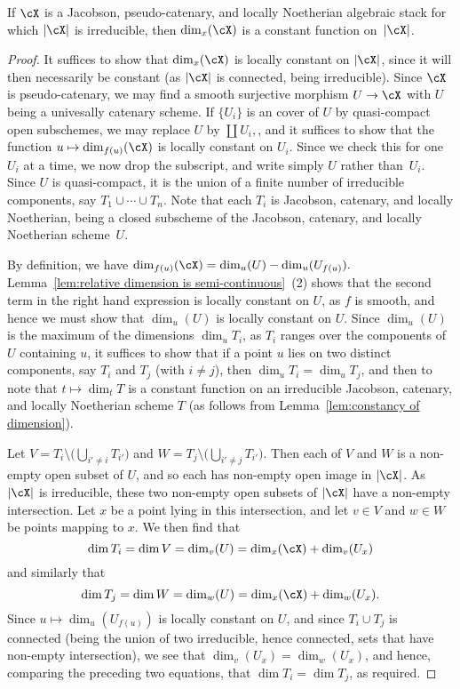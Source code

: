 \begin{alemma}
\label{lem:irreducible implies equidimensional}
If $\cX$ is
a Jacobson, pseudo-catenary, and locally Noetherian  algebraic stack
for which $|\cX|$ is irreducible,
then $\dim_x(\cX)$ is a constant function on~$|\cX|$.
\end{alemma}
\begin{proof}
It suffices to show that $\dim_x(\cX)$ is locally constant on $|\cX|$,
since it will then necessarily be constant (as $|\cX|$ is connected,
being irreducible).  Since $\cX$ is pseudo-catenary,
we may find a smooth surjective morphism $U \to \cX$ with $U$ 
being a univesally catenary scheme.  If $\{U_i\}$ is an 
cover of $U$ by quasi-compact open subschemes, we may replace 
$U$ by $\coprod U_i,$, and 
it suffices to show that
the function $u \mapsto \dim_{f(u)}(\cX)$ is locally constant on $U_i$.
Since we check this for one $U_i$ at a time, we now drop the subscript,
and write simply $U$ rather than~$U_i$.
Since $U$ is quasi-compact, it
is the union of a finite number of irreducible components,
say $T_1 \cup \cdots \cup T_n$.  Note that each $T_i$ is Jacobson,
catenary, and locally Noetherian,
being a closed subscheme of the Jacobson, catenary, and locally Noetherian
scheme~$U$.

By definition, we have $\dim_{f(u)}(\cX) = \dim_{u}(U) - \dim_{u}(U_{f(u)}).$
Lemma~\ref{lem:relative dimension is semi-continuous}~(2)
shows that the second term in the right hand expression is locally
constant on $U$, as $f$ is smooth,
and hence we must show that $\dim_u(U)$
is locally constant on $U$.  Since $\dim_u(U)$ is the maximum
of the dimensions $\dim_u T_i$, as $T_i$ ranges over the components
of $U$ containing $u$, it suffices to show
that if a point $u$ lies on two distinct components,
say $T_i$ and $T_j$ (with $i \neq j$),
then $\dim_u T_i = \dim_u T_j$,  
and then to note that $t\mapsto \dim_t T$ is a constant 
function on an irreducible Jacobson,
catenary, and locally Noetherian scheme $T$
(as follows from Lemma~\ref{lem:constancy of dimension}).


Let $V = T_i \setminus \bigl( \bigcup_{i' \neq i} T_{i'}\bigr)$ 
and $W = T_j \setminus \bigl( \bigcup_{i' \neq j} T_{i'}\bigr)$.
Then each of $V$ and $W$ is a non-empty open subset of $U$,
and so each has non-empty open image in $|\cX|$.  As $|\cX|$ is irreducible,
these two non-empty open subsets of $|\cX|$ have a non-empty intersection.
Let $x$ be a point lying in this intersection, and let $v \in V$ and 
$w\in W$ be points mapping to $x$.  
We then find that
$$\dim T_i = \dim V = \dim_v (U) = \dim_x (\cX) + \dim_v (U_x)$$
and similarly that
$$\dim T_j = \dim W = \dim_w (U) = \dim_x (\cX) + \dim_w (U_x).$$
Since $u \mapsto \dim_u (U_{f(u)})$ is locally constant on $U$,
and since $T_i \cup T_j$ is connected (being the union of two irreducible,
hence connected, sets that have non-empty intersection), 
we see that $\dim_v (U_x) = \dim_w(U_x)$, 
and hence, comparing the preceding two equations,
that $\dim T_i = \dim T_j$, as required.
\end{proof}


